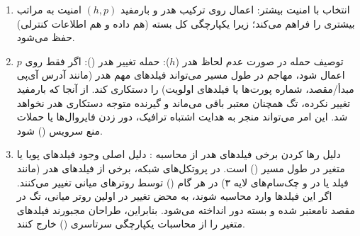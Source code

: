 \begin{enumerate}
    \item {انتخاب با امنیت بیشتر:}
    اعمال  روی {ترکیب هدر و بارمفید $(h, p)$} امنیت به مراتب بیشتری را فراهم می‌کند؛ زیرا یکپارچگی کل بسته (هم داده و هم اطلاعات کنترلی) حفظ می‌شود.

    \item {توصیف حمله در صورت عدم لحاظ هدر ($h$):}
    {حمله تغییر هدر ():} اگر  فقط روی $p$ اعمال شود، مهاجم در طول مسیر می‌تواند فیلدهای مهم هدر (مانند آدرس آی‌پی مبدأ/مقصد، شماره پورت‌ها یا فیلدهای اولویت) را دستکاری کند. از آنجا که بارمفید تغییر نکرده، تگ  همچنان معتبر باقی می‌ماند و گیرنده متوجه دستکاری هدر نخواهد شد. این امر می‌تواند منجر به هدایت اشتباه ترافیک، دور زدن فایروال‌ها یا حملات منع سرویس () شود.

    \item {دلیل رها کردن برخی فیلدهای هدر از محاسبه :}
    دلیل اصلی وجود {فیلدهای پویا یا متغیر در طول مسیر ()} است. در پروتکل‌های شبکه، برخی از فیلدهای هدر (مانند فیلد  یا  در  و چک‌سام‌های لایه ۳) در هر گام () توسط روترهای میانی تغییر می‌کنند. اگر این فیلدها وارد محاسبه  شوند، به محض تغییر در اولین روتر میانی، تگ  در مقصد نامعتبر شده و بسته دور انداخته می‌شود. بنابراین، طراحان مجبورند فیلدهای متغیر را از محاسبات یکپارچگی سرتاسری () خارج کنند.
\end{enumerate}